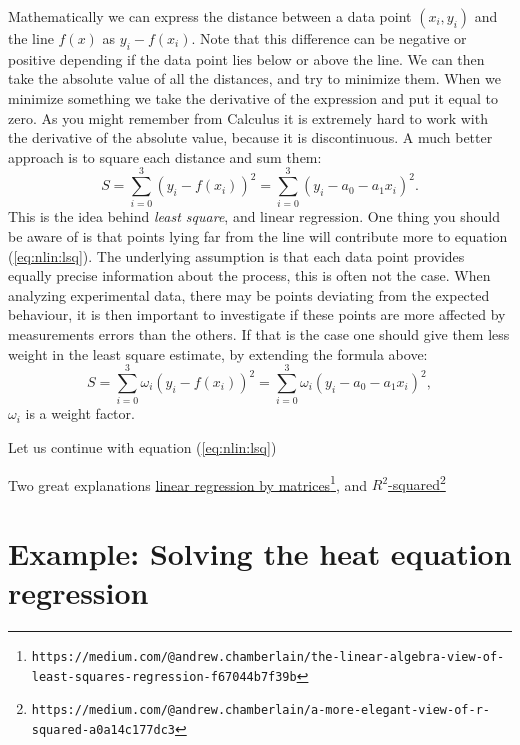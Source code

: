 \documentclass[graybox,sectrefs,envcountresetchap,open=right,final]{svmonodo}
\begin{document}
Mathematically we can express the distance between a data point $(x_i,y_i)$ and the line $f(x)$ as $y_i-f(x_i)$. Note that this difference can be negative or positive depending if the data point lies below or above the line. We can then take the absolute value of all the distances, and try to minimize them. When we minimize something we take the derivative of the expression and put it equal to zero.  As you might remember from Calculus it is extremely hard to work with the derivative of the absolute value, because it is discontinuous. A much better approach is to square each distance and sum them:
\begin{equation}
S=\sum_{i=0}^3(y_i-f(x_i))^2=\sum_{i=0}^3(y_i-a_0-a_1x_i)^2.
\label{eq:nlin:lsq}
\end{equation}
This is the idea behind \emph{least square}, and linear regression. One thing you should be aware of is that points lying far from the line will contribute more to equation (\ref{eq:nlin:lsq}). The underlying assumption is that each data point provides equally precise information about the process, this is often not the case. When analyzing experimental data, there may be points deviating from the expected behaviour, it is then important to investigate if these points are more affected by measurements errors than the others. If that is the case one should give them less weight in the least square estimate, by extending the formula above:
\begin{equation}
S=\sum_{i=0}^3\omega_i(y_i-f(x_i))^2=\sum_{i=0}^3\omega_i(y_i-a_0-a_1x_i)^2,
\label{eq:nlin:lsqm}
\end{equation}
$\omega_i$ is a weight factor.

Let us continue with equation (\ref{eq:nlin:lsq})

Two great explanations \href{{https://medium.com/@andrew.chamberlain/the-linear-algebra-view-of-least-squares-regression-f67044b7f39b}}{linear regression by
matrices}\footnote{\texttt{https://medium.com/@andrew.chamberlain/the-linear-algebra-view-of-least-squares-regression-f67044b7f39b}},
and 
\href{{https://medium.com/@andrew.chamberlain/a-more-elegant-view-of-r-squared-a0a14c177dc3}}{$R^2$-squared}\footnote{\texttt{https://medium.com/@andrew.chamberlain/a-more-elegant-view-of-r-squared-a0a14c177dc3}}

\section{Example: Solving the heat equation regression}
\end{document}

